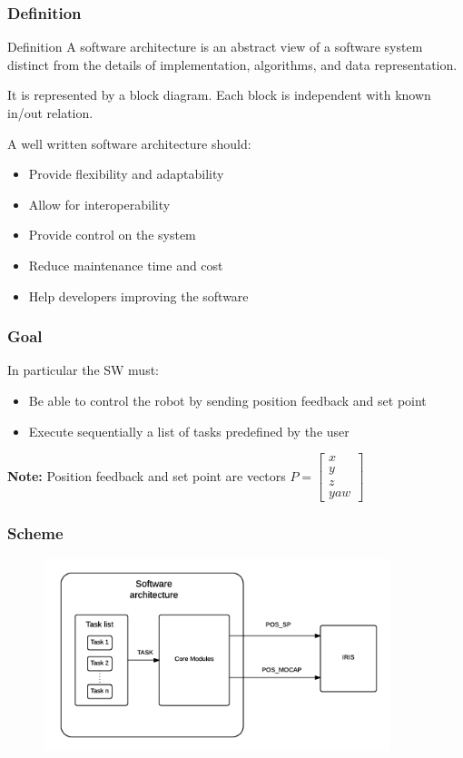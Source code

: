 \documentclass[xcolor=dvipsnames]{beamer}
\begin{document}
\begin{frame}
\tableofcontents[sectionstyle=show,square,currentsection]
\end{frame}

\begin{frame}[t]
\frametitle{Definition}
\begin{block}{Definition}
A software architecture is an abstract view of a software system distinct from the details of implementation, algorithms, and data representation.
\end{block}

It is represented by a block diagram. Each block is independent with known in/out relation.
\vspace{1ex}

A well written software architecture should:
 \begin{itemize}
 \item Provide flexibility and adaptability
 \item Allow for interoperability 
 \item Provide control on the system
 \item Reduce maintenance time and cost
 \item Help developers improving the software
 \end{itemize}

\end{frame}

\begin{frame}
\frametitle{Goal}
In particular the SW must:\begin{itemize}
\item Be able to control the robot by sending position feedback and set point
\item Execute sequentially a list of tasks predefined by the user
\end{itemize}

\vspace{2em}
\textbf{Note: }Position feedback and set point are vectors $P = \begin{bmatrix}
x\\y\\z\\yaw
\end{bmatrix}$
\end{frame}

\begin{frame}
\frametitle{Scheme}
\begin{figure}
\centering
\includegraphics[width = 0.9\textwidth]{f/nested_arch.png}
\end{figure}
\end{frame}
\end{document}

